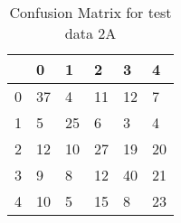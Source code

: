 \begin{table}[]
    \centering
\begin{tabular}{|l|l|l|l|l|l|}
\hline
&0&1&2&3&4\\
\hline
0&37&4&11&12&7\\
\hline
1&5&25&6&3&4\\
\hline
2&12&10&27&19&20\\
\hline
3&9&8&12&40&21\\
\hline
4&10&5&15&8&23\\
\hline
\end{tabular}
\caption{Confusion Matrix for test data 2A}
    \label{tab:conf_train2a}
\end{table}

